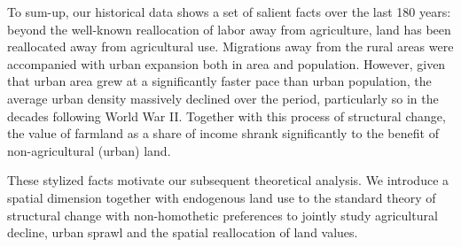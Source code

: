 \documentclass[./20250130-paper.tex]{subfiles}
\begin{document}













To sum-up, our historical data shows a set of salient facts over the last 180 years: beyond the well-known reallocation of labor away from agriculture, land has been reallocated away from agricultural use. Migrations away from the rural areas were accompanied with urban expansion both in area and population. However, given that urban area grew at a significantly faster pace than urban population, the average urban density massively declined over the period, particularly so in the decades following World War II. Together with this process of structural change, the value of farmland as a share of income shrank significantly to the benefit of non-agricultural (urban) land. 

These stylized facts motivate our subsequent theoretical analysis. We introduce a spatial dimension together with endogenous land use to the standard theory of structural change with non-homothetic preferences to jointly study agricultural decline, urban sprawl and the spatial reallocation of land values.
\end{document}
